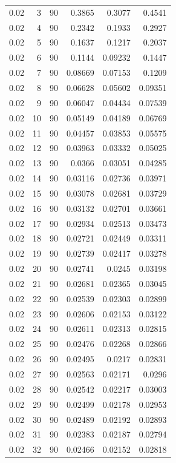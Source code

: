 \begin{tabular}{rrrrrr}
0.02 & 3 & 90 & 0.3865 & 0.3077 & 0.4541 \\
0.02 & 4 & 90 & 0.2342 & 0.1933 & 0.2927 \\
0.02 & 5 & 90 & 0.1637 & 0.1217 & 0.2037 \\
0.02 & 6 & 90 & 0.1144 & 0.09232 & 0.1447 \\
0.02 & 7 & 90 & 0.08669 & 0.07153 & 0.1209 \\
0.02 & 8 & 90 & 0.06628 & 0.05602 & 0.09351 \\
0.02 & 9 & 90 & 0.06047 & 0.04434 & 0.07539 \\
0.02 & 10 & 90 & 0.05149 & 0.04189 & 0.06769 \\
0.02 & 11 & 90 & 0.04457 & 0.03853 & 0.05575 \\
0.02 & 12 & 90 & 0.03963 & 0.03332 & 0.05025 \\
0.02 & 13 & 90 & 0.0366 & 0.03051 & 0.04285 \\
0.02 & 14 & 90 & 0.03116 & 0.02736 & 0.03971 \\
0.02 & 15 & 90 & 0.03078 & 0.02681 & 0.03729 \\
0.02 & 16 & 90 & 0.03132 & 0.02701 & 0.03661 \\
0.02 & 17 & 90 & 0.02934 & 0.02513 & 0.03473 \\
0.02 & 18 & 90 & 0.02721 & 0.02449 & 0.03311 \\
0.02 & 19 & 90 & 0.02739 & 0.02417 & 0.03278 \\
0.02 & 20 & 90 & 0.02741 & 0.0245 & 0.03198 \\
0.02 & 21 & 90 & 0.02681 & 0.02365 & 0.03045 \\
0.02 & 22 & 90 & 0.02539 & 0.02303 & 0.02899 \\
0.02 & 23 & 90 & 0.02606 & 0.02153 & 0.03122 \\
0.02 & 24 & 90 & 0.02611 & 0.02313 & 0.02815 \\
0.02 & 25 & 90 & 0.02476 & 0.02268 & 0.02866 \\
0.02 & 26 & 90 & 0.02495 & 0.0217 & 0.02831 \\
0.02 & 27 & 90 & 0.02563 & 0.02171 & 0.0296 \\
0.02 & 28 & 90 & 0.02542 & 0.02217 & 0.03003 \\
0.02 & 29 & 90 & 0.02499 & 0.02178 & 0.02953 \\
0.02 & 30 & 90 & 0.02489 & 0.02192 & 0.02893 \\
0.02 & 31 & 90 & 0.02383 & 0.02187 & 0.02794 \\
0.02 & 32 & 90 & 0.02466 & 0.02152 & 0.02818 \\

\end{tabular}
